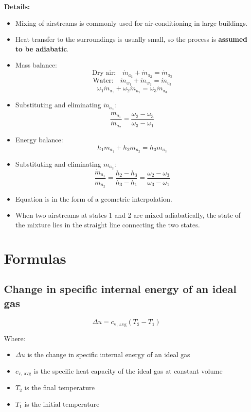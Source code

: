\documentclass[11pt]{article}
\begin{document}
\textbf{Details:}
\begin{itemize}
\item Mixing of airstreams is commonly used for air-conditioning in large buildings.
\item Heat transfer to the surroundings is usually small, so the process is \textbf{assumed to be adiabatic}.
\item Mass balance:
\[\text{Dry air:} \quad \dot{m}_{a_1} + \dot{m}_{a_2} = \dot{m}_{a_3}\]
\[\text{Water:} \quad \dot{m}_{w_1} + \dot{m}_{w_2} = \dot{m}_{v_3}\]
\[\omega_1 \dot{m}_{a_1} + \omega_2 \dot{m}_{a_2} = \omega_3 \dot{m}_{a_3}\]
\item Substituting and eliminating \(\dot{m}_{a_3}\):
\[\frac{\dot{m}_{a_1}}{\dot{m}_{a_2}} = \frac{\omega_2 - \omega_3}{\omega_3 - \omega_1}\]
\item Energy balance:
\[h_1 \dot{m}_{a_1} + h_2 \dot{m}_{a_2} = h_3 \dot{m}_{a_3}\]
\item Substituting and eliminating \(\dot{m}_{a_3}\):
\[\frac{\dot{m}_{a_1}}{\dot{m}_{a_2}} = \frac{h_2 - h_3}{h_3 - h_1} = \frac{\omega_2 - \omega_3}{\omega_3 - \omega_1}\]
\item Equation is in the form of a geometric interpolation.
\item When two airstreams at states 1 and 2 are mixed adiabatically, the state of the mixture lies in the straight line connecting the two states.
\end{itemize}

 \newpage
\section{Formulas}
\label{sec:org7b16ae9}

\subsection{Change in specific internal energy of an ideal gas}
\label{sec:org5900b07}
\[\Delta u = c_{\text{v, avg}} (T_2 - T_1)\]

Where:
\begin{itemize}
\item \(\Delta u\) is the change in specific internal energy of an ideal gas
\item \(c_{\text{v, avg}}\) is the specific heat capacity of the ideal gas at constant volume
\item \(T_2\) is the final temperature
\item \(T_1\) is the initial temperature
\end{itemize}
\end{document}
